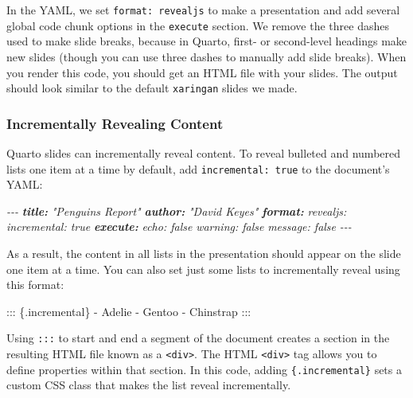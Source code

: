 \documentclass[
]{book}
\newenvironment{Shaded}{\begin{snugshade}}{\end{snugshade}}
\newcommand{\AnnotationTok}[1]{\textcolor[rgb]{0.56,0.35,0.01}{\textbf{\textit{#1}}}}
\newcommand{\CommentTok}[1]{\textcolor[rgb]{0.56,0.35,0.01}{\textit{#1}}}
\newcommand{\NormalTok}[1]{#1}
\newcommand{\SpecialStringTok}[1]{\textcolor[rgb]{0.31,0.60,0.02}{#1}}
\begin{document}
In the YAML, we set \texttt{format:\ revealjs} to make a presentation and add several global code chunk options in the \texttt{execute} section. We remove the three dashes used to make slide breaks, because in Quarto, first- or second-level headings make new slides (though you can use three dashes to manually add slide breaks). When you render this code, you should get an HTML file with your slides. The output should look similar to the default \texttt{xaringan} slides we made.

\hypertarget{incrementally-revealing-content-1}{%
\subsubsection*{Incrementally Revealing Content}\label{incrementally-revealing-content-1}}

Quarto slides can incrementally reveal content. To reveal bulleted and numbered lists one item at a time by default, add \texttt{incremental:\ true} to the document's YAML:

\begin{Shaded}
\begin{Highlighting}[]
\CommentTok{{-}{-}{-}}
\AnnotationTok{title:}\CommentTok{ "Penguins Report"}
\AnnotationTok{author:}\CommentTok{ "David Keyes"}
\AnnotationTok{format:}\CommentTok{ }
\CommentTok{  revealjs:}
\CommentTok{      incremental: true}
\AnnotationTok{execute:}\CommentTok{ }
\CommentTok{  echo: false}
\CommentTok{  warning: false}
\CommentTok{  message: false}
\CommentTok{{-}{-}{-}}
\end{Highlighting}
\end{Shaded}

As a result, the content in all lists in the presentation should appear on the slide one item at a time. You can also set just some lists to incrementally reveal using this format:

\begin{Shaded}
\begin{Highlighting}[]
\NormalTok{::: \{.incremental\}}
\SpecialStringTok{{-} }\NormalTok{Adelie}
\SpecialStringTok{{-} }\NormalTok{Gentoo}
\SpecialStringTok{{-} }\NormalTok{Chinstrap}
\NormalTok{:::}
\end{Highlighting}
\end{Shaded}

Using \texttt{:::} to start and end a segment of the document creates a section in the resulting HTML file known as a \texttt{\textless{}div\textgreater{}}. The HTML \texttt{\textless{}div\textgreater{}} tag allows you to define properties within that section. In this code, adding \texttt{\{.incremental\}} sets a custom CSS class that makes the list reveal incrementally.
\end{document}
